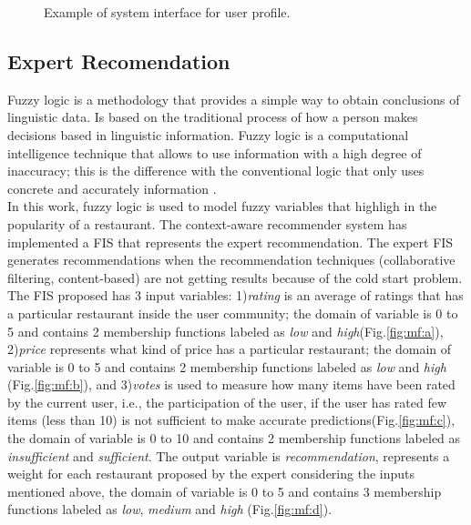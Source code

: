 \begin{figure*}
\captionsetup{justification=centering,margin=2cm}
\centering
\setlength\fboxsep{0pt}
\setlength\fboxrule{0.7pt}
\caption{Example of system interface for user profile.}
\label{fig:user-profile}       
\end{figure*}

\subsection{Expert Recomendation} \label{sec:3.3} 

Fuzzy logic is a methodology that provides a simple way to obtain
conclusions of linguistic data. Is based on the traditional process of
how a person makes decisions based in linguistic information.  Fuzzy
logic is a computational intelligence technique that allows to use
information with a high degree of inaccuracy; this is the difference
with the conventional logic that only uses concrete and accurately
information \cite{zedeh1989knowledge}.\\  In this work, fuzzy logic is
used to model fuzzy variables that highligh in the popularity of a
restaurant. The context-aware recommender system has implemented a FIS
that represents the expert recommendation. The expert FIS generates
recommendations when the recommendation techniques (collaborative
filtering, content-based) are not getting results because of the cold
start problem.\\ The FIS proposed has 3 input
variables\cite{garcia2009hybrid}: 1)\textit{rating} is an average of
ratings that has a particular restaurant inside the user community;
the domain of variable is 0 to 5 and contains 2 membership functions
labeled as \textit{low} and \textit{high}(Fig.\ref{fig:mf:a}),
2)\textit{price} represents what kind of price has a particular
restaurant; the domain of variable is 0 to 5 and contains 2 membership
functions labeled as \textit{low} and \textit{high}
(Fig.\ref{fig:mf:b}), and 3)\textit{votes} is used to measure how many
items have been rated by the current user, i.e., the participation of
the user, if the user has rated few items (less than 10) is not
sufficient to make accurate predictions(Fig.\ref{fig:mf:c}), the
domain of variable is 0 to 10 and contains 2 membership functions
labeled as \textit{insufficient} and \textit{sufficient}. The output
variable is \textit{recommendation}, represents a weight for each
restaurant proposed by the expert considering the inputs mentioned
above, the domain of variable is 0 to 5 and contains 3 membership
functions labeled as \textit{low}, \textit{medium} and \textit{high}
(Fig.\ref{fig:mf:d}).

